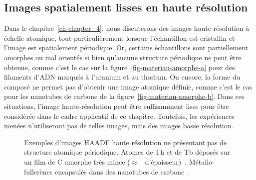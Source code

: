 \subsection{Images spatialement lisses en haute résolution}

Dans le chapitre~\ref{ch-chapter_4}, nous discuterons des images haute résolution à échelle atomique, tout particulièrement lorsque l'échantillon est cristallin et l'image est spatialement périodique.
%
Or, certains échantillons sont partiellement amorphes ou mal orientés si bien qu'aucune structure périodique ne peut être obtenue, comme c'est le cas sur la figure~\ref{fig-materiau-amorphe-a} pour des filaments d'ADN marqués à l'uranium et au thorium.
%
Ou encore, la forme du composé ne permet pas d'obtenir une image atomique définie, comme c'est le cas pour les nanotubes de carbone de la figure~\ref{fig-materiau-amorphe-b}.
%
Dans ces situations, l'image haute-résolution peut être suffisamment lisse pour être considérée dans le cadre applicatif de ce chapitre. Toutefois, les expériences menées n'utiliseront pas de telles images, mais des images basse résolution.  

\begin{figure}[h]
    \centering
    \hspace{1em}
    \caption{Exemples d’images HAADF haute résolution ne présentant pas de structure atomique périodique. 
        \protect{} Atomes de Th et de Tb déposés sur un film de C amorphe très mince ($\approx$~ d'épaisseur)~\cite{march2014adressing}.
        \protect{} Métallo-fullerènes encapsulés dans des nanotubes de carbone~\cite{colliex2012capturing}.
        \protect\label{fig-materiau-amorphe}}
\end{figure}


